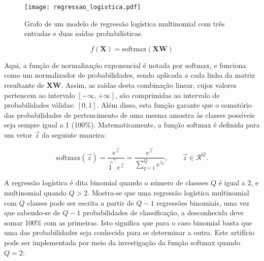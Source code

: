     \begin{figure}
      \begin{center}
        \texttt{[image: regressao\_logistica.pdf]}
      \end{center}
      \caption{Grafo de um modelo de regressão logística multinomial com três entradas e duas saídas probabilísticas.}
      \label{f:regressao_logistica}
    \end{figure}

    \begin{equation} \label{e:reg_logistica}
      f(\boldsymbol{X}) = \text{softmax}\left(\boldsymbol{X} \boldsymbol{W}\right)
    \end{equation}

    \noindent Aqui, a função de normalização exponencial é notada por $\text{softmax}$, e funciona como um normalizador de probabilidades, sendo aplicada a cada linha da matriz resultante de $\boldsymbol{X}\boldsymbol{W}$. Assim, as saídas desta combinação linear, cujos valores pertencem ao intervalo $[-\infty,+\infty]$, são comprimidas ao intervalo de probabilidades válidas: $[0,1]$. Além disso, esta função garante que o somatório das probabilidades de pertencimento de uma mesma amostra às classes possíveis seja sempre igual a 1 (100\%). Matematicamente, a função $\text{softmax}$ é definida para um vetor $\vec{z}$ da seguinte maneira:

    \begin{equation} \label{e:softmax}
      \text{softmax}(\vec{z}) =
      \frac{e^{\vec{z}}}{\vec{1}^\top e^{\vec{z}}} =
      \frac{e^{\vec{z}}}{\sum_{q=1}^Q e^{z_q}}
      , \qquad \vec{z} \in \mathcal{R}^Q
      .
    \end{equation}

    A regressão logística é dita binomial quando o número de classses $Q$ é igual a 2, e multinomial quando $Q>2$. Mostra-se que uma regressão logística multinomial com $Q$ classes pode ser escrita a partir de $Q-1$ regressões binomiais, uma vez que sabendo-se de $Q-1$ probabilidades de classificação, a desconhecida deve somar 100\% com as primeiras. Isto significa que para o caso binomial basta que uma das probabilidades seja conhecida para se determinar a outra. Este artifício pode ser implementada por meio da investigação da função softmax quando $Q=2$:

